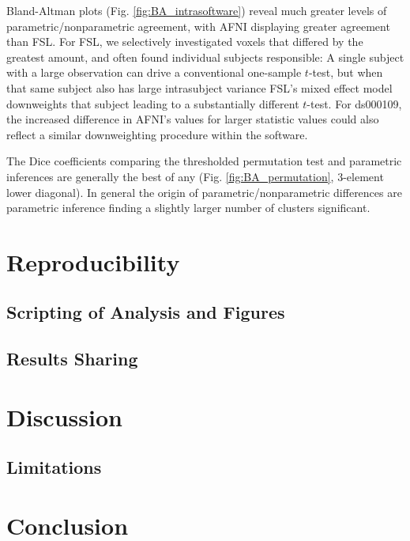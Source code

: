 Bland-Altman plots (Fig. \ref{fig:BA_intrasoftware}) reveal much greater levels of parametric/nonparametric agreement, with AFNI displaying greater agreement than FSL. For FSL, we selectively investigated voxels that differed by the greatest amount, and often found individual subjects responsible: A single subject with a large observation can drive a conventional one-sample $t$-test, but when that same subject also has large intrasubject variance FSL's mixed effect model downweights that subject leading to a substantially different $t$-test. For ds000109, the increased difference in AFNI's values for larger statistic values could also reflect a similar downweighting procedure within the software.

The Dice coefficients comparing the thresholded permutation test and parametric inferences are generally the best of any (Fig. \ref{fig:BA_permutation}, 3-element lower diagonal). In general the origin of parametric/nonparametric differences are parametric inference finding a slightly larger number of clusters significant.

\section{Reproducibility}

\subsection{Scripting of Analysis and Figures}

\subsection{Results Sharing}

\section{Discussion}

\subsection{Limitations}

\section{Conclusion}

